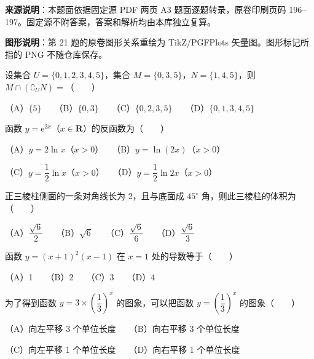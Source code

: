 

\begin{gktip}
\textbf{来源说明}：本题面依据固定源 PDF 两页 A3 题面逐题转录，原卷印刷页码 196–197。固定源不附答案，答案和解析均由本库独立复算。

\textbf{图形说明}：第 21 题的原卷图形关系重绘为 TikZ/PGFPlots 矢量图。图形标记所指的 PNG 不随仓库保存。
\end{gktip}


\begin{question}
设集合 $U=\{0,1,2,3,4,5\}$，集合 $M=\{0,3,5\}$，$N=\{1,4,5\}$，则 $M\cap(\complement_U N)=$\mbox{（　　）}

（A）$\{5\}$　　（B）$\{0,3\}$　　（C）$\{0,2,3,5\}$　　（D）$\{0,1,3,4,5\}$

\end{question}
\begin{question}
函数 $y=\mathrm{e}^{2x}$（$x\in\mathbf{R}$）的反函数为\mbox{（　　）}

（A）$y=2\ln x$（$x>0$）　　（B）$y=\ln(2x)$（$x>0$）

（C）$y=\dfrac{1}{2}\ln x$（$x>0$）　　（D）$y=\dfrac{1}{2}\ln 2x$（$x>0$）

\end{question}
\begin{question}
正三棱柱侧面的一条对角线长为 2，且与底面成 $45^\circ$ 角，则此三棱柱的体积为\mbox{（　　）}

（A）$\dfrac{\sqrt{6}}{2}$　　（B）$\sqrt{6}$　　（C）$\dfrac{\sqrt{6}}{6}$　　（D）$\dfrac{\sqrt{6}}{3}$

\end{question}
\begin{question}
函数 $y=(x+1)^2(x-1)$ 在 $x=1$ 处的导数等于\mbox{（　　）}

（A）1　　（B）2　　（C）3　　（D）4

\end{question}
\begin{question}
为了得到函数 $y=3\times\left(\dfrac{1}{3}\right)^x$ 的图象，可以把函数 $y=\left(\dfrac{1}{3}\right)^x$ 的图象\mbox{（　　）}

（A）向左平移 3 个单位长度　　（B）向右平移 3 个单位长度

（C）向左平移 1 个单位长度　　（D）向右平移 1 个单位长度

\end{question}

